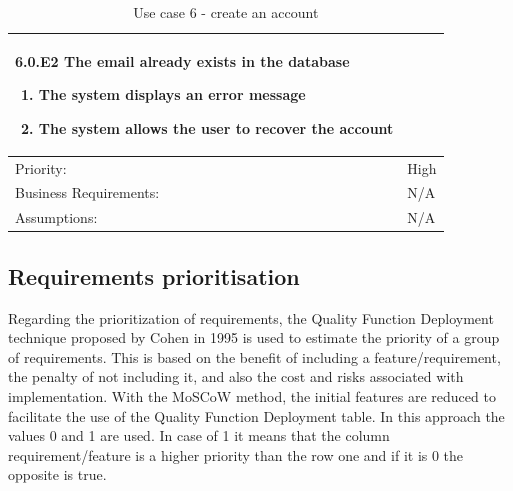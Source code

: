 \begin{table}[H]
\begin{adjustbox}{width=1.2\textwidth,center=\textwidth}
\begin{tabular}{|m{4cm}|m{12cm}|}
\begin{enumerate}
            \end{enumerate}
            \textbf{6.0.E2 The email already exists in the database}
            \begin{enumerate}
                \item The system displays an error message
                \item The system allows the user to recover the account
            \end{enumerate} \\
            \hline
            Priority: & High \\
            \hline
            Business Requirements: & N/A \\
            \hline
            Assumptions: & N/A \\
            \hline
        \end{tabular}
    \end{adjustbox}
    \caption{Use case 6 - create an account}
    \label{use case 6}
\end{table}

\subsection*{Requirements prioritisation}

Regarding the prioritization of requirements, the Quality Function Deployment technique
proposed by Cohen in 1995 is used to estimate the priority of a group of requirements.
This is based on the benefit of including a feature/requirement, the penalty of not including
it, and also the cost and risks associated with implementation. With the MoSCoW method, the
initial features are reduced to facilitate the use of the Quality Function Deployment table.
\newline
In this approach the values 0 and 1 are used. In case of 1 it means that the column requirement/feature
is a higher priority than the row one and if it is 0 the opposite is true.


